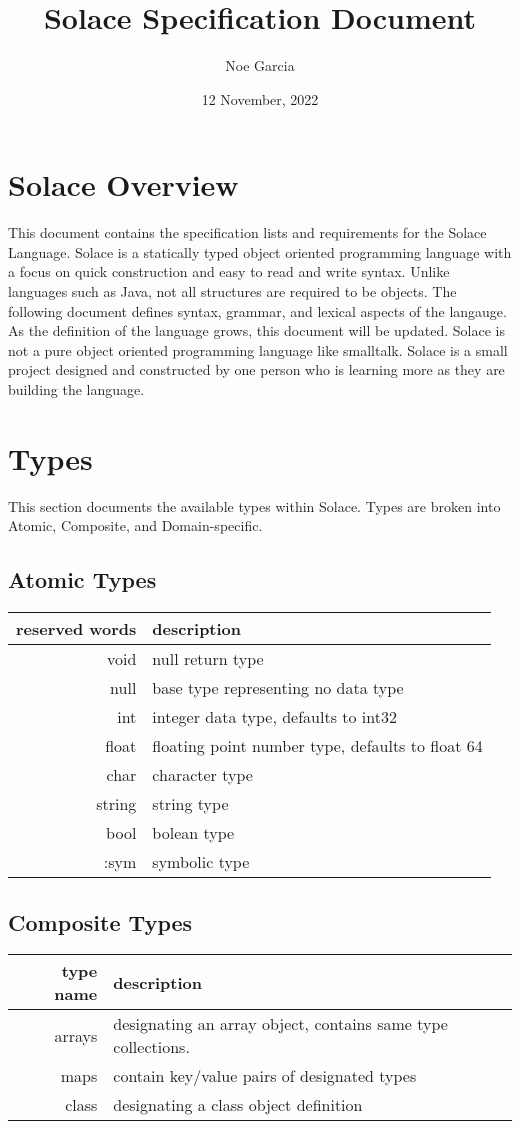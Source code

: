 \documentclass{article}
\title{
	\vspace{2in}
	\textmd{\textbf{Solace Specification Document}}
	\vspace{3in}
}
\author{Noe Garcia}
\date{12 November, 2022}
\begin{document}
\maketitle
\newpage

\section{Solace Overview}
This document contains the specification lists and requirements for the Solace Language.
Solace is a statically typed object oriented programming language with a focus on quick
construction and easy to read and write syntax. Unlike languages such as Java, not all
structures are required to be objects. The following document defines syntax, grammar, and
lexical aspects of the langauge. As the definition of the language grows, this document
will be updated.
Solace is not a pure object oriented programming language like smalltalk.
Solace is a small project designed and constructed by one person who is learning more
as they are building the language.


\section{Types}
This section documents the available types within Solace. Types are broken into Atomic,
Composite, and Domain-specific.

\subsection{Atomic Types}
\begin{tabular}{r|l}
	reserved words & description \\
	\hline
	\hline
	void & null return type \\
	null & base type representing no data type \\
	int & integer data type, defaults to int32 \\
	float & floating point number type, defaults to float 64 \\
	char & character type \\
	string & string type \\
	bool & bolean type \\
	:sym & symbolic type \\
	\hline
\end{tabular}

\subsection{Composite Types}
\begin{tabular}{r|l}
	type name & description \\
	\hline
	\hline
	arrays & designating an array object, contains same type collections. \\
	maps & contain key/value pairs of designated types \\
	class & designating a class object definition \\
	\hline
\end{tabular}
\end{document}
